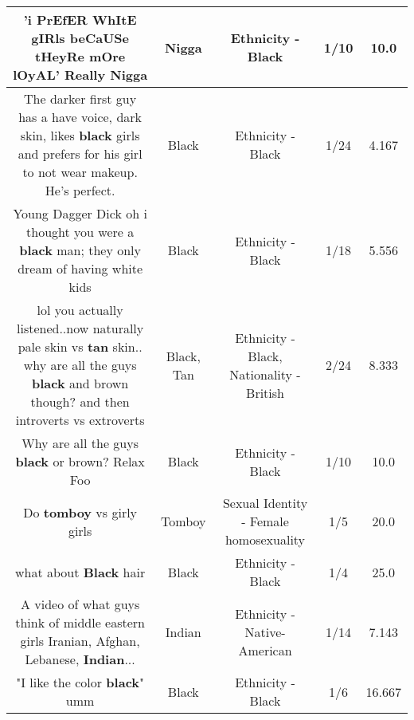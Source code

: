 \documentclass[11pt]{article}
\newlength\mylength
\begin{document}
\begin{center}
\begin{longtable}{|C{.65\mylength}|C{.30\mylength}|C{.12\mylength}|C{.12\mylength}|C{.12\mylength}|}
  \small 'i PrEfER WhItE gIRls beCaUSe tHeyRe mOre lOyAL' Really Nigga\normalsize   & Nigga & Ethnicity - Black & 1/10 & 10.0 \\  \hline
  \small The darker first guy has a have voice, dark skin, likes \textbf{black} girls and prefers for his girl to not wear makeup. He's perfect.\normalsize   & Black & Ethnicity - Black & 1/24 & 4.167 \\  \hline
  \small Young Dagger Dick oh i thought you were a \textbf{black} man; they only dream of having white kids\normalsize   & Black & Ethnicity - Black & 1/18 & 5.556 \\  \hline
  \small lol you actually listened..now naturally pale skin vs \textbf{tan} skin.. why are all the guys \textbf{black} and brown though? and then introverts vs extroverts\normalsize   & Black, Tan & Ethnicity - Black, Nationality - British & 2/24 & 8.333 \\  \hline
  \small Why are all the guys \textbf{black} or brown? Relax Foo\normalsize   & Black & Ethnicity - Black & 1/10 & 10.0 \\  \hline
  \small Do \textbf{tomboy} vs girly girls\normalsize   & Tomboy & Sexual Identity - Female homosexuality & 1/5 & 20.0 \\  \hline
  \small what about \textbf{Black} hair\normalsize   & Black & Ethnicity - Black & 1/4 & 25.0 \\  \hline
  \small A video of what guys think of middle eastern girls Iranian, Afghan, Lebanese, \textbf{Indian}...\normalsize   & Indian & Ethnicity - Native-American & 1/14 & 7.143 \\  \hline
  \small "I like the color \textbf{black}" umm\normalsize   & Black & Ethnicity - Black & 1/6 & 16.667 \\  \hline

\end{longtable}
\end{center}
\end{document}
